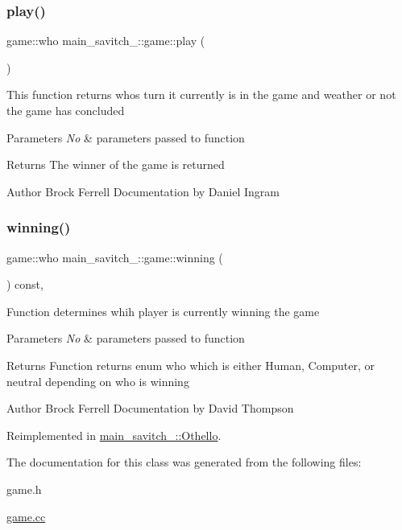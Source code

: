 \subsubsection{\texorpdfstring{play()}{play()}}
{\footnotesize\ttfamily game\+::who main\+\_\+savitch\+\_\+::game\+::play (\begin{DoxyParamCaption}{ }\end{DoxyParamCaption})}

This function returns whos turn it currently is in the game and weather or not the game has concluded 
\begin{DoxyParams}{Parameters}
{\em No} & parameters passed to function \\
\hline
\end{DoxyParams}
\begin{DoxyReturn}{Returns}
The winner of the game is returned 
\end{DoxyReturn}
\begin{DoxyAuthor}{Author}
Brock Ferrell Documentation by Daniel Ingram 
\end{DoxyAuthor}
\mbox{\label{classmain__savitch__14_1_1game_a2f0d5338c12bd98d52fe2383ece5c45e}} 
\subsubsection{\texorpdfstring{winning()}{winning()}}
{\footnotesize\ttfamily game\+::who main\+\_\+savitch\+\_\+::game\+::winning (\begin{DoxyParamCaption}{ }\end{DoxyParamCaption}) const\hspace{0.3cm}{\ttfamily [protected]}, {\ttfamily [virtual]}}

Function determines whih player is currently winning the game 
\begin{DoxyParams}{Parameters}
{\em No} & parameters passed to function \\
\hline
\end{DoxyParams}
\begin{DoxyReturn}{Returns}
Function returns enum who which is either Human, Computer, or neutral depending on who is winning 
\end{DoxyReturn}
\begin{DoxyAuthor}{Author}
Brock Ferrell Documentation by David Thompson 
\end{DoxyAuthor}


Reimplemented in \mbox{\hyperlink{classmain__savitch__14_1_1_othello_a4ea78b18eea66c944c0a9356349e0fd4}{main\+\_\+savitch\+\_\+::\+Othello}}.



The documentation for this class was generated from the following files\+:\begin{DoxyCompactItemize}
\item 
game.\+h\item 
\mbox{\hyperlink{game_8cc}{game.\+cc}}\end{DoxyCompactItemize}
